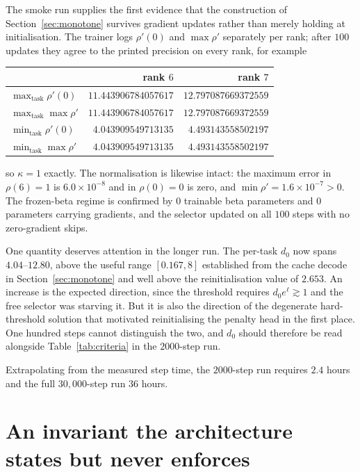 \documentclass[11pt]{article}
\begin{document}
The smoke run supplies the first evidence that the construction of
Section~\ref{sec:monotone} survives gradient updates rather than merely
holding at initialisation. The trainer logs $\rho'(0)$ and $\max\rho'$
separately per rank; after $100$ updates they agree to the printed precision
on every rank, for example

\begin{center}
\begin{tabular}{@{}lrr@{}}
\toprule
 & rank $6$ & rank $7$ \\
\midrule
$\max_{\text{task}} \rho'(0)$   & $11.443906784057617$ & $12.797087669372559$ \\
$\max_{\text{task}} \max\rho'$  & $11.443906784057617$ & $12.797087669372559$ \\
$\min_{\text{task}} \rho'(0)$   & $4.043909549713135$  & $4.493143558502197$ \\
$\min_{\text{task}} \max\rho'$  & $4.043909549713135$  & $4.493143558502197$ \\
\bottomrule
\end{tabular}
\end{center}

so $\kappa = 1$ exactly. The normalisation is likewise intact: the maximum
error in $\rho(6) = 1$ is $6.0 \times 10^{-8}$ and in $\rho(0) = 0$ is zero,
and $\min \rho' = 1.6 \times 10^{-7} > 0$. The frozen-beta regime is confirmed
by $0$ trainable beta parameters and $0$ parameters carrying gradients, and
the selector updated on all $100$ steps with no zero-gradient skips.

One quantity deserves attention in the longer run. The per-task $d_0$ now
spans $4.04$--$12.80$, above the useful range $[0.167, 8]$ established from the
cache decode in Section~\ref{sec:monotone} and well above the reinitialisation
value of $2.653$. An increase is the expected direction, since the threshold
requires $d_0 e^{\ell} \gtrsim 1$ and the free selector was starving it. But it
is also the direction of the degenerate hard-threshold solution that motivated
reinitialising the penalty head in the first place. One hundred steps cannot
distinguish the two, and $d_0$ should therefore be read alongside
Table~\ref{tab:criteria} in the $2000$-step run.

Extrapolating from the measured step time, the $2000$-step run requires
$2.4$ hours and the full $30{,}000$-step run $36$ hours.

\section{An invariant the architecture states but never enforces}
\label{sec:kappa}
\end{document}
